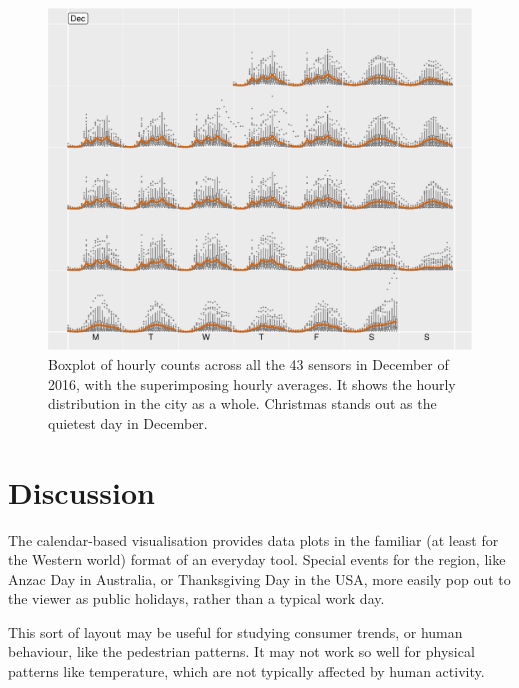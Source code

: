 \documentclass[article]{jss}
\begin{document}
\begin{CodeChunk}
\begin{figure}

{\centering \includegraphics[width=\textwidth]{figure/boxplot-1} 

}

\caption[Boxplot of hourly counts across all the 43 sensors in December of 2016, with the superimposing hourly averages]{Boxplot of hourly counts across all the 43 sensors in December of 2016, with the superimposing hourly averages. It shows the hourly distribution in the city as a whole. Christmas stands out as the quietest day in December.}\label{fig:boxplot}
\end{figure}
\end{CodeChunk}

\section{Discussion}\label{discussion}

\label{sec:discussion}

The calendar-based visualisation provides data plots in the familiar (at
least for the Western world) format of an everyday tool. Special events
for the region, like Anzac Day in Australia, or Thanksgiving Day in the
USA, more easily pop out to the viewer as public holidays, rather than a
typical work day.

This sort of layout may be useful for studying consumer trends, or human
behaviour, like the pedestrian patterns. It may not work so well for
physical patterns like temperature, which are not typically affected by
human activity.


\end{document}
